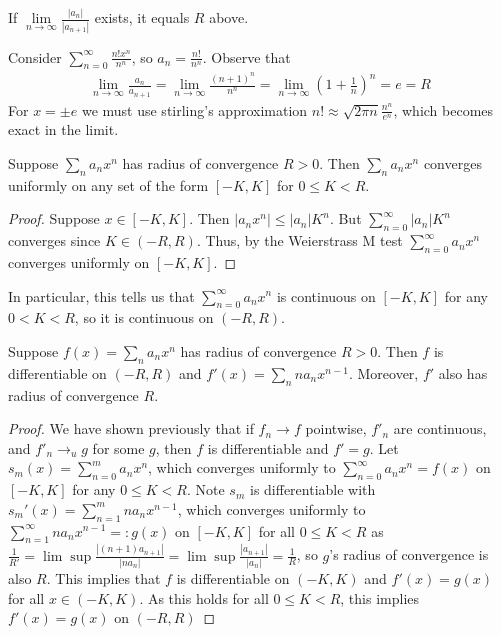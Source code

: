 \begin{cor}
    If $\lim\limits_{n\rightarrow \infty}\frac{|a_n|}{|a_{n+1}|}$ exists, it equals $R$ above.
\end{cor}

\begin{eg}
    Consider $\sum_{n=0}^{\infty}\frac{n!x^n}{n^n}$, so $a_n = \frac{n!}{n^n}$. Observe that \begin{align*}
        \lim\limits_{n\rightarrow \infty}\frac{a_n}{a_{n+1}} = \lim\limits_{n\rightarrow \infty}\frac{(n+1)^n}{n^n} = \lim\limits_{n\rightarrow \infty}\left(1+\frac{1}{n}\right)^n = e = R
    \end{align*}
    For $x = \pm e$ we must use stirling's approximation $n! \approx \sqrt{2\pi n}\frac{n^n}{e^n}$, which becomes exact in the limit.
\end{eg}


\begin{prop}
    Suppose $\sum_{n}a_nx^n$ has radius of convergence $R > 0$. Then $\sum_na_nx^n$ converges uniformly on any set of the form $[-K,K]$ for $0 \leq K < R$.
\end{prop}
\begin{proof}
    Suppose $x \in [-K,K]$. Then $|a_nx^n| \leq |a_n|K^n$. But $\sum_{n=0}^{\infty}|a_n|K^n$ converges since $K \in (-R,R)$. Thus, by the Weierstrass M test $\sum_{n=0}^{\infty}a_nx^n$ converges uniformly on $[-K,K]$.
\end{proof}
In particular, this tells us that $\sum_{n=0}^{\infty}a_nx^n$ is continuous on $[-K,K]$ for any $0 < K < R$, so it is continuous on $(-R,R)$.

\begin{prop}
    Suppose $f(x) = \sum_na_nx^n$ has radius of convergence $R > 0$. Then $f$ is differentiable on $(-R,R)$ and $f'(x) = \sum_nna_nx^{n-1}$. Moreover, $f'$ also has radius of convergence $R$.
\end{prop}
\begin{proof}
    We have shown previously that if $f_n\rightarrow f$ pointwise, $f'_n$ are continuous, and $f'_n\rightarrow_ug$ for some $g$, then $f$ is differentiable and $f' = g$. Let $s_m(x) = \sum_{n=0}^ma_nx^n$, which converges uniformly to $\sum_{n=0}^{\infty}a_nx^n=f(x)$ on $[-K,K]$ for any $0 \leq K < R$. Note $s_m$ is differentiable with $s_m'(x) = \sum_{n=1}^mna_nx^{n-1}$, which converges uniformly to $\sum_{n=1}^{\infty}na_nx^{n-1} =: g(x)$ on $[-K,K]$ for all $0 \leq K < R$ as $\frac{1}{R'} = \lim\sup\frac{|(n+1)a_{n+1}|}{|na_n|} = \lim\sup\frac{|a_{n+1}|}{|a_n|} = \frac{1}{R}$, so $g$'s radius of convergence is also $R$. This implies that $f$ is differentiable on $(-K,K)$ and $f'(x) = g(x)$ for all $x \in (-K,K)$. As this holds for all $0 \leq K < R$, this implies $f'(x) = g(x)$ on $(-R,R)$
\end{proof}

